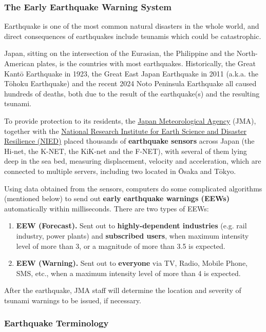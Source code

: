\documentclass[10pt]{article}
\begin{document}
\subsubsection{The Early Earthquake Warning System}

Earthquake is one of the most common natural disasters in the whole world, and direct consequences of earthquakes include tsunamis which could be catastrophic.

Japan, sitting on the intersection of the Eurasian, the Philippine and the North-American plates, is the countries with most earthquakes. Historically, the Great Kant\=o Earthquake in 1923, the Great East Japan Earthquake in 2011 (a.k.a. the T\=ohoku Earthquake) and the recent 2024 Noto Peninsula Earthquake all caused hundreds of deaths, both due to the result of the earthquake(s) and the resulting tsunami.

To provide protection to its residents, the \href{https://www.jma.go.jp/jma/index.html}{Japan Meteorological Agency} (JMA), together with the \href{https://www.bosai.go.jp}{National Research Institute for Earth Science and Disaster Resilience (NIED)} placed thousands of \textbf{earthquake sensors} across Japan (the Hi-net, the K-NET, the KiK-net and the F-NET), with several of them lying deep in the sea bed, measuring displacement, velocity and acceleration, which are connected to multiple servers, including two located in \=Osaka and T\=okyo.

Using data obtained from the sensors, computers do some complicated algorithms (mentioned below) to send out \textbf{early earthquake warnings (EEWs)} automatically within milliseconds. There are two types of EEWs:
\begin{enumerate}
    \item \textbf{EEW (Forecast).} Sent out to \textbf{highly-dependent industries} (e.g. rail industry, power plants) and \textbf{subscribed users}, when maximum intensity level of more than 3, or a magnitude of more than 3.5 is expected.
    \item \textbf{EEW (Warning).} Sent out to \textbf{everyone} via TV, Radio, Mobile Phone, SMS, etc., when a maximum intensity level of more than 4 is expected.
\end{enumerate}

After the earthquake, JMA staff will determine the location and severity of tsunami warnings to be issued, if necessary.

\subsubsection{Earthquake Terminology}
\end{document}
